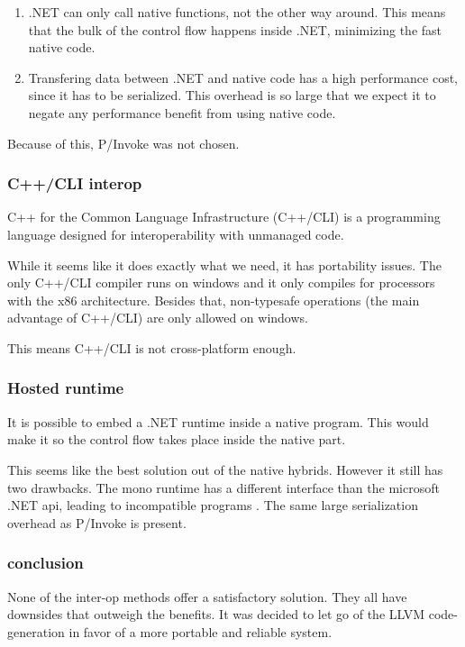 \begin{enumerate}
    \item .NET can only call native functions, not the other way around.
        This means that the bulk of the control flow happens inside .NET, minimizing the fast native code.
    \item Transfering data between .NET and native code has a high performance cost\cite{msdn_interop_performance}, since it has to be serialized.
        This overhead is so large that we expect it to negate any performance benefit from using native code.
\end{enumerate}

Because of this, P/Invoke was not chosen.

\subsubsection*{C++/CLI interop}
C++ for the Common Language Infrastructure (C++/CLI) is a programming language designed for interoperability with unmanaged code.\cite{msdn_c++cli}

While it seems like it does exactly what we need, it has portability issues.
The only C++/CLI compiler runs on windows and it only compiles for processors with the x86 architecture\cite{mono_c++cli}.
Besides that, non-typesafe operations (the main advantage of C++/CLI) are only allowed on windows.\cite{mono_c++cli}

This means C++/CLI is not cross-platform enough.

\subsubsection*{Hosted runtime}
It is possible to embed a .NET runtime inside a native program.
This would make it so the control flow takes place inside the native part.

This seems like the best solution out of the native hybrids.
However it still has two drawbacks.
The mono runtime has a different interface than the microsoft .NET api, leading to incompatible programs \cite{mono_embedding}.
The same large serialization overhead as P/Invoke is present\cite{msdn_hosted}.

\subsubsection*{conclusion}
None of the inter-op methods offer a satisfactory solution.
They all have downsides that outweigh the benefits.
It was decided to let go of the LLVM code-generation in favor of a more portable and reliable system.

